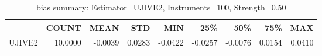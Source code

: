\begin{table}[ht]
\centering
\caption{bias summary: Estimator=UJIVE2, Instruments=100, Strength=0.50}
\begin{tabular}{lrrrrrrrr}
\toprule
 & COUNT & MEAN & STD & MIN & 25\% & 50\% & 75\% & MAX \\
\midrule
UJIVE2 & 10.0000 & -0.0039 & 0.0283 & -0.0422 & -0.0257 & -0.0076 & 0.0154 & 0.0410 \\
\bottomrule
\end{tabular}
\end{table}
